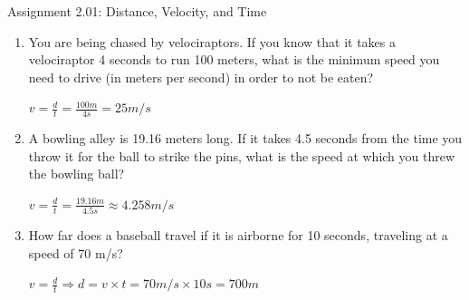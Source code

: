 \documentclass[letterpaper, 12pt]{article}
\begin{document}


\begin{center} Assignment 2.01: Distance, Velocity, and Time
\end{center}





\begin{enumerate}

\item You are being chased by velociraptors.  If you know that it takes a velociraptor 4 seconds to run 100 meters, what is the minimum speed you need to drive (in meters per second) in order to not be eaten?
\color{red}
\begin{center} $ v = \frac{d}{t} = \frac{100m}{4s} = 25 m/s $
	


\end{center}

\vspace{0.15in}
\color{black}
\item A bowling alley is 19.16 meters long.  If it takes 4.5 seconds from the time you throw it for the ball to strike the pins, what is the speed at which you threw the bowling ball?
\color{red}
\begin{center} $ v = \frac{d}{t} = \frac{19.16m}{4.5s} \approx 4.258 m/s $
	
\end{center}


\vspace{0.15in}
\color{black}
\item How far does a baseball travel if it is airborne for 10 seconds, traveling at a speed of 70 m/s?
\color{red}

\begin{center} $ v = \frac{d}{t} \Longrightarrow d = v \times t = 70 m/s \times 10 s = 700 m $
	
\end{center}


\vspace{0.15in}
\color{black}


\end{enumerate}
\end{document}
